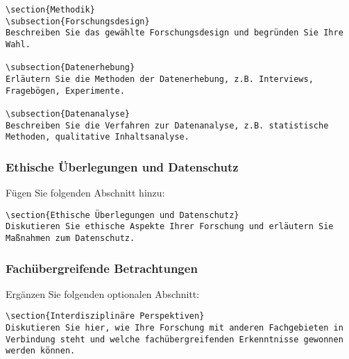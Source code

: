 \documentclass[a4paper,12pt]{article}
\begin{document}
\begin{lstlisting}
\section{Methodik}
\subsection{Forschungsdesign}
Beschreiben Sie das gewählte Forschungsdesign und begründen Sie Ihre Wahl.

\subsection{Datenerhebung}
Erläutern Sie die Methoden der Datenerhebung, z.B. Interviews, Fragebögen, Experimente.

\subsection{Datenanalyse}
Beschreiben Sie die Verfahren zur Datenanalyse, z.B. statistische Methoden, qualitative Inhaltsanalyse.
\end{lstlisting}

\subsubsection{Ethische Überlegungen und Datenschutz}
Fügen Sie folgenden Abschnitt hinzu:

\begin{lstlisting}
\section{Ethische Überlegungen und Datenschutz}
Diskutieren Sie ethische Aspekte Ihrer Forschung und erläutern Sie Maßnahmen zum Datenschutz.
\end{lstlisting}

\subsubsection{Fachübergreifende Betrachtungen}
Ergänzen Sie folgenden optionalen Abschnitt:

\begin{lstlisting}
\section{Interdisziplinäre Perspektiven}
Diskutieren Sie hier, wie Ihre Forschung mit anderen Fachgebieten in Verbindung steht und welche fachübergreifenden Erkenntnisse gewonnen werden können.
\end{lstlisting}
\end{document}
